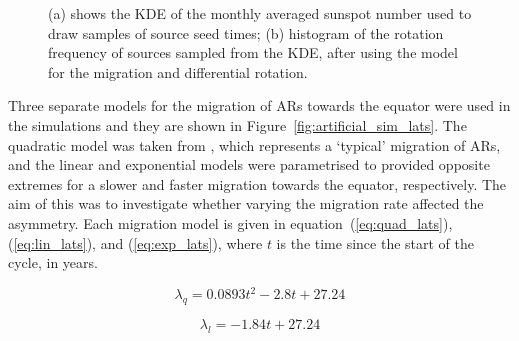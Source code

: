 \begin{figure}[ht!]
	\centering
	\qquad
	\caption{(a) shows the KDE of the monthly averaged sunspot number used to draw samples of source seed times; (b) histogram of the rotation frequency of sources sampled from the KDE, after using the model for the migration and differential rotation.} 
	\label{fig:KDE_lats}
\end{figure}

Three separate models for the migration of ARs towards the equator were used in the simulations and they are shown in Figure~\ref{fig:artificial_sim_lats}. The quadratic model was taken from \citet{li_latitude_2001}, which represents a `typical' migration of ARs, and the linear and exponential models were parametrised to provided opposite extremes for a slower and faster migration towards the equator, respectively. The aim of this was to investigate whether varying the migration rate affected the asymmetry. Each migration model is given in equation~(\ref{eq:quad_lats}), (\ref{eq:lin_lats}), and (\ref{eq:exp_lats}), where $t$ is the time since the start of the cycle, in years.

\begin{equation}
\lambda_{q} = 0.0893t^2 - 2.8t + 27.24
\label{eq:quad_lats}
\end{equation}

\begin{equation}
\lambda_{l} = -1.84t + 27.24
\label{eq:lin_lats}
\end{equation}

